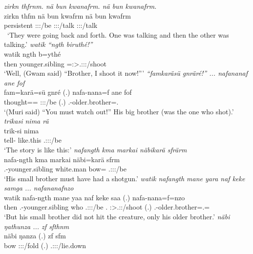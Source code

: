 \begin{exe}
	\emph{zirkn thfrnm. nä bun kwanafrm. nä bun kwanafrm.}\\
	\gll zirkn thfm {nä bun} kwafrm {nä bun} kwafrm\\ 
	persistent \Stdu:\Sbj:\Pst:\Dur/be {\Indf} \Sg:\Sbj:\Pst:\Dur/talk {\Indf} \Sg:\Sbj:\Pst:\Dur/talk\\\
	\trans `They were going back and forth. One was talking and then the other was talking.'
\exi{51} 
	\emph{watik ``ngth biruthé!''}\\
	\gll watik ngth b=ythé\\ 
	then younger.sibling \Med=\Fsg:\Sbj>\Tsg.\Masc:\Obj:\Nonpast:\Ipfv/shoot\\
	\trans `Well, (Gwam said) ``Brother, I shoot it now!'''
	\emph{``famkaräsü gnräré!'' ... nafananaf ane fof}\\
	\gll fam=karä=sü gnré (.) nafa-nana=f ane fof\\ 
	thought=\Prop=\Etc{} \Ssg:\Sbj:\Imp:\Ipfv/be (.) \Third.\Poss-older.brother=\Erg.{\Sg} {\Dem} {\Emph}\\
	\trans `(Muri said) ``You must watch out!'' His big brother (was the one who shot).'
\exi{53} 
	\emph{trikasi nima rä}\\
	\gll trik-si nima \\ 
	tell-{\Nmlz} like.this \Tsg.\F:\Sbj:\Nonpast:\Ipfv/be\\
	\trans `The story is like this:'
	\emph{nafangth kma markai näbikarä sfrärm}\\
	\gll nafa-ngth kma markai näbi=karä sfrm\\ 
	\Third.\Poss-younger.sibling {\Pot} white.man bow={\Prop} \Tsg.\Masc:\Sbj:\Pst:\Dur/be\\
	\trans `His small brother must have had a shotgun.'
	\emph{watik nafangth mane yara naf keke samga ... nafananafnzo}\\
	\gll watik nafa-ngth mane yaa naf keke saa (.) nafa-nana=f=nzo\\ 
	then \Third.\Poss-younger.sibling who \Tsg.\Masc:\Sbj:\Pst:\Ipfv/be \Tsg.{\Erg} {\Neg} \Sg:\Sbj>\Tsg.\Masc:\Pst:\Pfv/shoot (.) \Third.\Poss-older.brother=\Erg.\Sg=\Only\\
	\trans `But his small brother did not hit the creature, only his older brother.'
\exi{56} 
	\emph{näbi ŋathunza ... zf sfthnm}\\
	\gll näbi ŋanza (.) zf sfm\\ 
	bow \Sg:\Sbj:\Pst:\Ipfv/fold (.) {\Imm} \Tsg.\Masc:\Sbj:\Pst:\Dur/lie.down\\

\end{exe}
